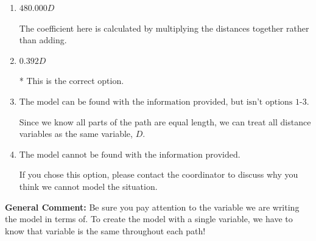\documentclass{extbook}[14pt]
\begin{document}
\begin{enumerate}
{\begin{enumerate}[label=\Alph*.]
The coefficient here is calculated as if you were trying to model the distance on the total path.
\item \( 480.000 D \)

The coefficient here is calculated by multiplying the distances together rather than adding.
\item \( 0.392 D \)

* This is the correct option.
\item \( \text{The model can be found with the information provided, but isn't options 1-3.} \)

Since we know all parts of the path are equal length, we can treat all distance variables as the same variable, $D$.
\item \( \text{The model cannot be found with the information provided.} \)

If you chose this option, please contact the coordinator to discuss why you think we cannot model the situation.
\end{enumerate}

\textbf{General Comment:} Be sure you pay attention to the variable we are writing the model in terms of. To create the model with a single variable, we have to know that variable is the same throughout each path!
}
\end{enumerate}
\end{document}

